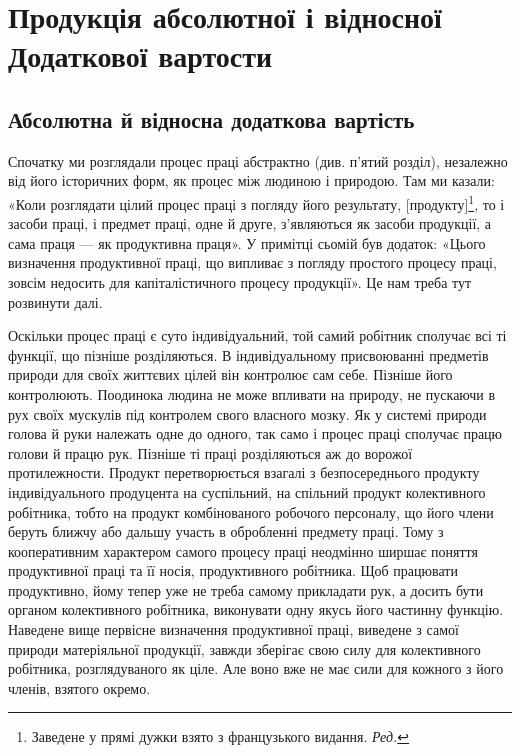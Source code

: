 
\chapter{Продукція абсолютної і відносної
Додаткової вартости}

\section{Абсолютна й відносна додаткова вартість}

Спочатку ми розглядали процес праці абстрактно (див. п’ятий
розділ), незалежно від його історичних форм, як процес між
людиною і природою. Там ми казали: «Коли розглядати цілий
процес праці з погляду його результату, [продукту]\footnote*{
Заведене у прямі дужки взято з французького видання. \emph{Ред.}
}, то і засоби
праці, і предмет праці, одне й друге, з’являються як засоби
продукції, а сама праця — як продуктивна праця». У примітці
сьомій був додаток: «Цього визначення продуктивної праці,
що випливає з погляду простого процесу праці, зовсім недосить
для капіталістичного процесу продукції». Це нам треба тут
розвинути далі.

Оскільки процес праці є суто індивідуальний, той самий
робітник сполучає всі ті функції, що пізніше розділяються. В індивідуальному
присвоюванні предметів природи для своїх життєвих
цілей він контролює сам себе. Пізніше його контролюють.
Поодинока людина не може впливати на природу, не пускаючи
в рух своїх мускулів під контролем свого власного мозку. Як у
системі природи голова й руки належать одне до одного, так само
і процес праці сполучає працю голови й працю рук. Пізніше ті
праці розділяються аж до ворожої протилежности. Продукт перетворюється
взагалі з безпосереднього продукту індивідуального
продуцента на суспільний, на спільний продукт колективного
робітника, тобто на продукт комбінованого робочого персоналу,
що його члени беруть ближчу або дальшу участь в обробленні
предмету праці. Тому з кооперативним характером самого процесу
праці неодмінно ширшає поняття продуктивної праці та
її носія, продуктивного робітника. Щоб працювати продуктивно,
йому тепер уже не треба самому прикладати рук, а досить бути
органом колективного робітника, виконувати одну якусь його
частинну функцію. Наведене вище первісне визначення продуктивної
праці, виведене з самої природи матеріяльної продукції,
завжди зберігає свою силу для колективного робітника, розглядуваного
як ціле. Але воно вже не має сили для кожного з його
членів, взятого окремо.

